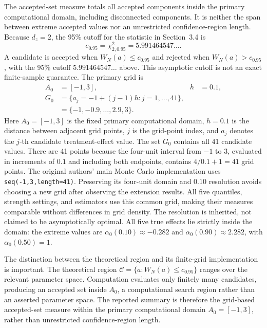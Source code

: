 The accepted-set measure totals all accepted components inside the primary computational domain, including disconnected components. It is neither the span between extreme accepted values nor an unrestricted confidence-region length. Because $d_z=2$, the 95\% cutoff for the statistic in Section~3.4 is
\begin{equation}
  c_{0.95}=\chi^2_{2,0.95}=5.991464547\ldots.
  \label{eq:wn-critical-value}
\end{equation}
A candidate is accepted when $W_N(a)\leq c_{0.95}$ and rejected when $W_N(a)>c_{0.95}$, with the 95\% cutoff $5.991464547\ldots$ above. This asymptotic cutoff is not an exact finite-sample guarantee. The primary grid is
\begin{equation}
  \begin{aligned}
    A_0&=[-1,3],
    &h&=0.1,\\
    G_0&=\{a_j=-1+(j-1)h:j=1,\ldots,41\},\\
       &=\{-1,-0.9,\ldots,2.9,3\}.
  \end{aligned}
  \label{eq:primary-grid}
\end{equation}
Here $A_0=[-1,3]$ is the fixed primary computational domain, $h=0.1$ is the distance between adjacent grid points, $j$ is the grid-point index, and $a_j$ denotes the $j$-th candidate treatment-effect value. The set $G_0$ contains all 41 candidate values. There are 41 points because the four-unit interval from $-1$ to $3$, evaluated in increments of $0.1$ and including both endpoints, contains $4/0.1+1=41$ grid points. The original authors' main Monte Carlo implementation uses \texttt{seq(-1,3,length=41)}. Preserving its four-unit domain and $0.10$ resolution avoids choosing a new grid after observing the extension results. All five quantiles, strength settings, and estimators use this common grid, making their measures comparable without differences in grid density. The resolution is inherited, not claimed to be asymptotically optimal. All five true effects lie strictly inside the domain: the extreme values are $\alpha_0(0.10)\approx-0.282$ and $\alpha_0(0.90)\approx2.282$, with $\alpha_0(0.50)=1$.

The distinction between the theoretical region and its finite-grid implementation is important. The theoretical region $\mathcal C=\{a:W_N(a)\leq c_{0.95}\}$ ranges over the relevant parameter space. Computation evaluates only finitely many candidates, producing an accepted set inside $A_0$, a computational search region rather than an asserted parameter space. The reported summary is therefore the grid-based accepted-set measure within the primary computational domain $A_0=[-1,3]$, rather than unrestricted confidence-region length.


